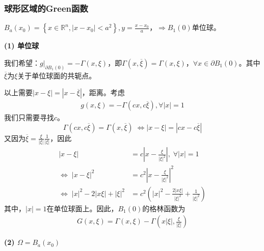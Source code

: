 \documentclass[11pt, a4paper]{article}
\theoremstyle{theorem}
\begin{document}
\subsubsection{球形区域的Green函数}

$B_a (x_0) = \left\{x \in \mathbb{R}^n, |x - x_0| < a^2\right\}, y = \frac{x - x_0}{a}$，$\Longrightarrow B_1(0)$单位球。

\textbf{(1) 单位球}

我们希望：$g \bigg|_{\partial B_1(0)} = - \Gamma(x,\xi)$，即$\Gamma(x,\overline{\xi}) = \Gamma(x,\xi)$，$\forall x \in \partial B_1(0)$。其中$\overline{\xi}$为$\xi$关于单位球面的共轭点。

以上需要$|x - \xi| = |x - \overline{\xi}|$，距离。考虑
\begin{align*}
    g(x,\xi) = - \Gamma(cx, c \overline{\xi}), \forall |x| = 1
\end{align*}
我们只需要寻找$c$。
$$
\Gamma(cx, c \overline{\xi}) = \Gamma(x, \overline{\xi}) \; \Leftrightarrow |x - \xi| = |cx - c \overline{\xi}|
$$
又因为$\overline{\xi} = \frac{\xi}{|\xi|} \frac{1}{|\xi|}$，因此
\begin{align*}
    |x - \xi| &= c \left|x - \frac{\xi}{|\xi|^2}\right|, \; \forall |x| = 1 \\
    \Leftrightarrow \; |x - \xi|^2 &= c^2 \left|x - \frac{\xi}{|\xi|^2}\right|^2 \\
    \Leftrightarrow \; |x|^2 - 2|x\xi| + |\xi|^2 &= c^2 \left(|x|^2 - \frac{2 |x \xi|}{|\xi|^2} + \frac{1}{|\xi|^2}\right)
\end{align*}
其中，$|x| = 1$在单位球面上。因此，$B_1(0)$的格林函数为
\begin{align}
    G(x,\xi) = \Gamma(x,\xi) - \Gamma\left(x|\xi|, \frac{\xi}{|\xi|}\right)
\end{align}

\textbf{(2) $\Omega = B_a(x_0)$}
\end{document}

